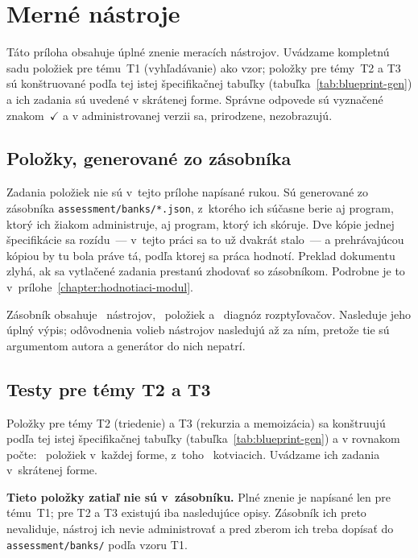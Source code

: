 \chapter{Merné nástroje}
\label{chapter:instrumenty}

Táto príloha obsahuje úplné znenie meracích nástrojov. Uvádzame kompletnú sadu položiek pre tému~T1 (vyhľadávanie) ako vzor; položky pre témy~T2 a T3 sú konštruované podľa tej istej špecifikačnej tabuľky (tabuľka~\ref{tab:blueprint-gen}) a ich zadania sú uvedené v skrátenej forme. Správne odpovede sú vyznačené znakom~$\checkmark$ a v administrovanej verzii sa, prirodzene, nezobrazujú.

\section{Položky, generované zo zásobníka}
\label{sec:generovane-polozky}

Zadania položiek nie sú v~tejto prílohe napísané rukou. Sú generované zo
zásobníka \texttt{assessment/banks/*.json}, z~ktorého ich súčasne berie aj
program, ktorý ich žiakom administruje, aj program, ktorý ich skóruje. Dve kópie
jednej špecifikácie sa rozídu~--- v~tejto práci sa to už dvakrát stalo~--- a
prehrávajúcou kópiou by tu bola práve tá, podľa ktorej sa práca hodnotí. Preklad
dokumentu zlyhá, ak sa vytlačené zadania prestanú zhodovať so zásobníkom.
Podrobne je to v~prílohe~\ref{chapter:hodnotiaci-modul}.

Zásobník obsahuje \asmBanks{}~nástrojov, \asmItems{}~položiek a
\asmDistractorsDiagnosed{}~diagnóz rozptyľovačov. Nasleduje jeho úplný výpis;
odôvodnenia volieb nástrojov nasledujú až za ním, pretože tie sú argumentom
autora a generátor do nich nepatrí.



\section{Testy pre témy T2 a T3}
\label{sec:testy-t2-t3}

Položky pre témy T2 (triedenie) a T3 (rekurzia a memoizácia) sa konštruujú podľa
tej istej špecifikačnej tabuľky (tabuľka~\ref{tab:blueprint-gen}) a v rovnakom
počte: \asmFormItems{}~položiek v~každej forme, z~toho \asmAnchors{}~kotviacich.
Uvádzame ich zadania v~skrátenej forme.

\textbf{Tieto položky zatiaľ nie sú v~zásobníku.} Plné znenie je napísané len
pre tému~T1; pre T2 a T3 existujú iba nasledujúce opisy. Zásobník ich preto
nevaliduje, nástroj ich nevie administrovať a pred zberom ich treba dopísať do
\texttt{assessment/banks/} podľa vzoru T1.

